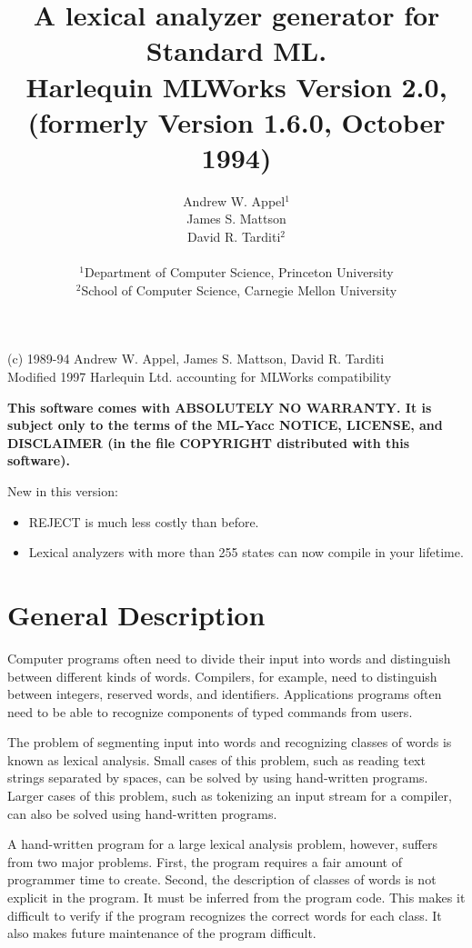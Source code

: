\documentclass{article}
\title{        A lexical analyzer generator for Standard ML.\\
			Harlequin MLWorks Version 2.0,\\
		    (formerly Version 1.6.0, October 1994)
      }
\author{                    Andrew W. Appel$^1$\\
	                    James S. Mattson\\
        	            David R. Tarditi$^2$\\
\\              
\small
$^1$Department of Computer Science, Princeton University \\
\small
$^2$School of Computer Science, Carnegie Mellon University
}
\date{}
\begin{document}
\maketitle
\begin{center}
(c) 1989-94 Andrew W. Appel, James S. Mattson, David R. Tarditi\\
Modified 1997 Harlequin Ltd. accounting for MLWorks compatibility
\end{center}

{\bf
This software comes with ABSOLUTELY NO WARRANTY.  It is subject only to
the terms of the ML-Yacc NOTICE, LICENSE, and DISCLAIMER (in the
file COPYRIGHT distributed with this software).
}

\vspace{1in}

New in this version:  
\begin{itemize}
\item REJECT is much less costly than before.
\item Lexical analyzers with more than 255 states can now compile in your
lifetime.
\end{itemize}

\newpage
\tableofcontents
\newpage

\section{General Description}

Computer programs often need to divide their input into words and
distinguish between different kinds of words.  Compilers, for
example, need to distinguish between integers, reserved words, and
identifiers.  Applications programs often need to be able to
recognize components of typed commands from users.

The problem of segmenting input into words and recognizing classes of
words is known as lexical analysis.  Small cases of this problem,
such as reading text strings separated by spaces, can be solved by
using hand-written programs.  Larger cases of this problem, such as
tokenizing an input stream for a compiler, can also be solved using
hand-written programs.

A hand-written program for a large lexical analysis problem, however,
suffers from two major problems.  First, the program requires a fair
amount of programmer time to create.  Second, the description of
classes of words is not explicit in the program.  It must be inferred
from the program code.  This makes it difficult to verify if the
program recognizes the correct words for each class.  It also makes
future maintenance of the program difficult.
\end{document}
